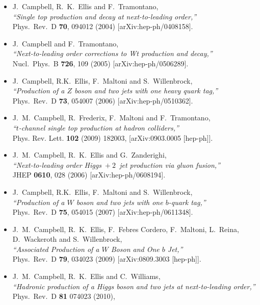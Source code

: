 \documentclass{article}
\begin{document}
{{{{{{\begin{itemize}
\item J.~Campbell, R.~K.~Ellis and F.~Tramontano, \\
  {\it ``Single top production and decay at next-to-leading order,''} \\
  Phys.\ Rev.\ D {\bf 70}, 094012 (2004)
  [arXiv:hep-ph/0408158].
\item J.~Campbell and F.~Tramontano, \\
  {\it ``Next-to-leading order corrections to Wt production and
  decay,''} \\
  Nucl.\ Phys.\ B {\bf 726}, 109 (2005)
  [arXiv:hep-ph/0506289].
\item J.~Campbell, R.K.~Ellis, F.~Maltoni and S.~Willenbrock, \\
  {\it ``Production of a $Z$ boson and two jets with one heavy quark tag,''} \\
  Phys.\ Rev.\ D {\bf 73}, 054007 (2006)
  [arXiv:hep-ph/0510362].
\item J.~M.~Campbell, R.~Frederix, F.~Maltoni and F.~Tramontano,\\
  {\it ``$t$-channel single top production at hadron colliders,''} \\ 
  Phys. Rev. Lett. {\bf 102} (2009) 182003,
  [arXiv:0903.0005 [hep-ph]].
\item J.~M.~Campbell, R.~K.~Ellis and G.~Zanderighi, \\
  {\it ``Next-to-leading order Higgs~$+~2$~jet production via gluon fusion,''} \\
  JHEP {\bf 0610}, 028 (2006)
  [arXiv:hep-ph/0608194].
\item J.~Campbell, R.K.~Ellis, F.~Maltoni and S.~Willenbrock, \\
  {\it ``Production of a $W$ boson and two jets with one $b$-quark
  tag,''} \\
  Phys.\ Rev.\ D {\bf 75}, 054015 (2007)
  [arXiv:hep-ph/0611348].
\item J.~M.~Campbell, R.~K.~Ellis, F.~Febres Cordero, F.~Maltoni, L.~Reina, D.~Wackeroth and S.~Willenbrock, \\
  {\it ``Associated Production of a $W$ Boson and One $b$ Jet,''} \\
  Phys.\ Rev.\  D {\bf 79}, 034023 (2009)
  [arXiv:0809.3003 [hep-ph]].
\item J.~M.~Campbell, R.~K.~Ellis and C.~Williams, \\
  {\it ``Hadronic production of a Higgs boson and two jets at next-to-leading order,''} \\
   Phys.\ Rev.\ D {\bf 81} 074023 (2010),

\end{itemize}}}}}}}
\end{document}
